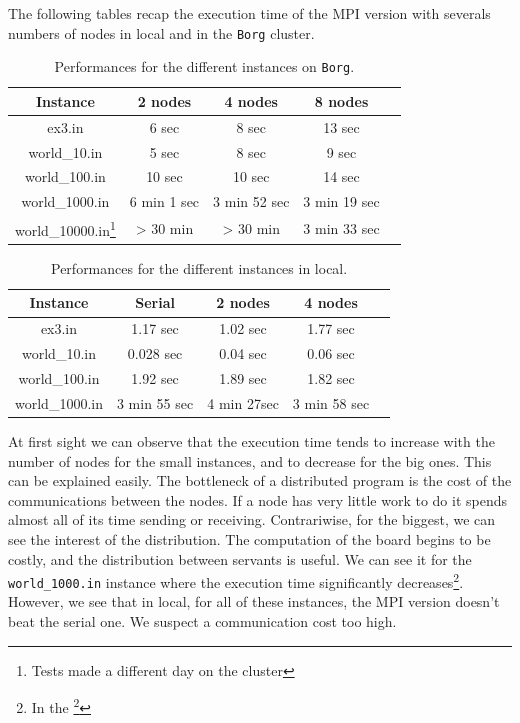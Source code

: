 \documentclass[a4paper,10pt]{article}
\begin{document}
The following tables recap the execution time of the MPI version with severals numbers of nodes in local and in the \texttt{Borg} cluster.
\begin{table}[!ht]
\centering
\begin{tabular}{|c||c|c|c|c|}
  \hline
    Instance     &  2 nodes   & 4 nodes  & 8 nodes  \\
  \hline
    ex3.in       &    6 sec       & 8 sec       &  13 sec \\
  \hline
    world\_10.in &    5 sec      & 8 sec      &  9 sec \\
  \hline
   world\_100.in &    10 sec     & 10 sec     &  14 sec \\
  \hline
  world\_1000.in &     6 min 1 sec   & 3 min 52 sec      & 3 min 19 sec  \\
  \hline
  world\_10000.in\footnote{Tests made a different day on the cluster} &     > 30 min        &          > 30 min              &3 min 33 sec \\
  \hline
\end{tabular}
\caption{Performances for the different instances on \texttt{Borg}.}
\end{table}

\begin{table}[!ht]
\centering
\begin{tabular}{|c||c|c|c|c|}
  \hline
    Instance     & Serial   & 2 nodes   & 4 nodes   \\
  \hline
    ex3.in       &    1.17 sec   &  1.02 sec  & 1.77 sec  \\ 
  \hline
    world\_10.in &    0.028 sec   &  0.04 sec      & 0.06 sec   \\ 
  \hline
   world\_100.in &    1.92 sec   &   1.89 sec     &  1.82 sec   \\ 
  \hline
  world\_1000.in &    3 min 55 sec  &    4 min 27sec   & 3 min 58 sec   \\ 
  \hline
\end{tabular}
\caption{Performances for the different instances in local.}
\end{table}


At first sight we can observe that the execution time tends to increase with the number of nodes for the small instances, and
to decrease for the big ones. This can be explained easily. The bottleneck of a distributed program is the cost of the communications
between the nodes. If a node has very little work to do it spends almost all of its time sending or receiving.
Contrariwise, for the biggest, we can see the interest of the distribution. The computation of the board begins to be costly, and
the distribution between servants is useful. We can see it for the \texttt{world\_1000.in} instance where the execution time
significantly decreases\footnote{In the \footnote{Cluster}}. However, we see that in local, for all of these instances, the MPI version doesn't beat the serial one.
We suspect a communication cost too high.
\\
\end{document}
